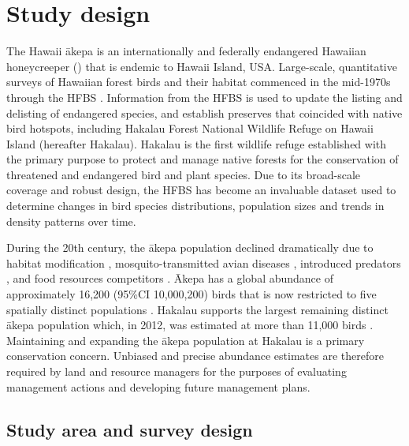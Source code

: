 \documentclass{stylefile16/statsoc}
\newcommand{\akepa}{\textquotesingle\={a}kepa}  %
\newcommand{\Akepa}{\textquotesingle\={A}kepa}  %
\newcommand{\hawaii}{Hawai\textquotesingle i}   %
\begin{document}
\section{Study design}
\label{sec-study-design}

The \hawaii{} \akepa{} is an internationally and federally endangered Hawaiian honeycreeper (\citealp{usfws_akepa_1970, birdlife_akepa_2016}) that is endemic to \hawaii{} Island, USA.  Large-scale, quantitative surveys of Hawaiian forest birds and their habitat commenced in the mid-1970s through the HFBS \citep{scott_HFBS_1986}. Information from the HFBS is used to update the listing and delisting of endangered species, and establish preserves that coincided with native bird hotspots, including Hakalau Forest National Wildlife Refuge on \hawaii{} Island (hereafter Hakalau).  Hakalau is the first wildlife refuge established with the primary purpose to protect and manage native forests for the conservation of threatened and endangered bird and plant species. Due to its broad-scale coverage and robust design, the HFBS has become an invaluable dataset used to determine changes in bird species distributions, population sizes and trends in density patterns over time.

During the 20th century, the \akepa{} population declined dramatically due to habitat modification \citep{scott_HFBS_1986, pratt_avifaunal_1994},  mosquito-transmitted avian diseases \citep{pratt_avifaunal_1994, atkinson_wildlife_1995}, introduced predators \citep{lepson_akepa_1997}, and food resources competitors \citep{lepson_akepa_1997}. \Akepa{} has a global abundance of approximately 16,200 (95\%CI 10,000,200) birds that is now restricted to five spatially distinct populations \citep{judge_akepa_2018}. Hakalau supports the largest remaining distinct \akepa{} population which, in 2012, was estimated at more than 11,000 birds \citep{camp_statespace_2016}. Maintaining and expanding the \akepa{} population at Hakalau is a primary conservation concern. Unbiased and precise abundance estimates are therefore required by land and resource managers for the purposes of evaluating management actions and developing future management plans.

\subsection{Study area and survey design}
\end{document}
